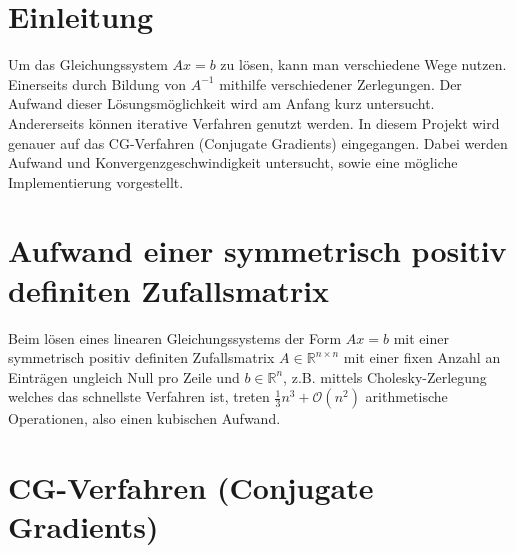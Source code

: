 \documentclass[12pt,a4paper]{scrartcl}
\numberwithin{equation}{section}
\numberwithin{myalgctr}{section}
\numberwithin{mytheoremctr}{subsection}
\numberwithin{mykorollarctr}{subsection}
\numberwithin{mylemmactr}{subsection}
\numberwithin{mybeispielctr}{subsection}
\begin{document}
	\newpage
	\tableofcontents
	\thispagestyle{general}
	\newpage

	\section{Einleitung}
	Um das Gleichungssystem $Ax = b$ zu lösen, kann man verschiedene Wege nutzen. Einerseits durch Bildung von $A^{-1}$ mithilfe verschiedener Zerlegungen. Der Aufwand dieser Lösungsmöglichkeit wird am Anfang kurz untersucht. Andererseits können iterative Verfahren genutzt werden. In diesem Projekt wird genauer auf das CG-Verfahren (Conjugate Gradients) eingegangen. Dabei werden Aufwand und Konvergenzgeschwindigkeit untersucht, sowie eine mögliche Implementierung vorgestellt. 
	\newpage
	
	\section{Aufwand einer symmetrisch positiv definiten Zufallsmatrix}
	Beim lösen eines linearen Gleichungssystems der Form $Ax = b$ mit einer symmetrisch positiv definiten Zufallsmatrix $A\in\mathbb{R}^{n\times n}$ mit einer fixen Anzahl an Einträgen ungleich Null pro Zeile und $b \in \mathbb{R}^{n}$, z.B. mittels Cholesky-Zerlegung welches das schnellste Verfahren ist, treten $\frac{1}{3}n^{3} + \mathcal{O}(n^{2})$ arithmetische Operationen, also einen kubischen Aufwand. 
	
	 
	
	
	
	\section{CG-Verfahren (Conjugate Gradients)}
	
\end{document}
